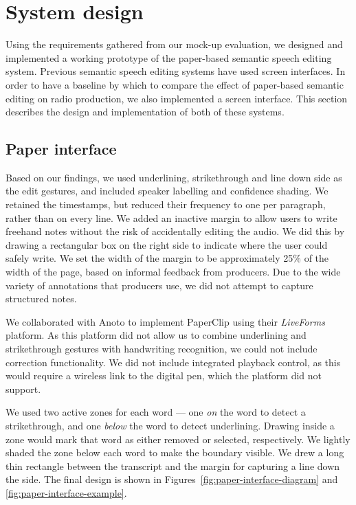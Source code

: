 \section{System design}\label{sec:paper-design}





Using the requirements gathered from our mock-up evaluation, we designed and implemented a working prototype of the
paper-based semantic speech editing system.  Previous semantic speech editing systems have used screen interfaces. In
order to have a baseline by which to compare the effect of paper-based semantic editing on radio production, we also
implemented a screen interface. This section describes the design and implementation of both of these systems.

\subsection{Paper interface}

Based on our findings, we used underlining, strikethrough and line down side as the edit gestures, and included speaker
labelling and confidence shading.  We retained the timestamps, but reduced their frequency to one per paragraph, rather
than on every line.  We added an inactive margin to allow users to write freehand notes without the risk of
accidentally editing the audio.  We did this by drawing a rectangular box on the right side to indicate where the user
could safely write.  We set the width of the margin to be approximately 25\% of the width of the page, based on
informal feedback from producers.  Due to the wide variety of annotations that producers use, we did not attempt to
capture structured notes.

We collaborated with Anoto to implement PaperClip using their \textit{Live\texttrademark Forms} platform. As this
platform did not allow us to combine underlining and strike\-through gestures with handwriting recognition, we could
not include correction functionality.  We did not include integrated playback control, as this would require a wireless
link to the digital pen, which the platform did not support.

We used two active zones for each word --- one \textit{on} the word to detect a strikethrough, and one \textit{below}
the word to detect underlining. Drawing inside a zone would mark that word as either removed or selected, respectively.
We lightly shaded the zone below each word to make the boundary visible.
We drew a long thin rectangle between the transcript and the margin for capturing a line down the side. The final
design is shown in Figures~\ref{fig:paper-interface-diagram} and \ref{fig:paper-interface-example}.


